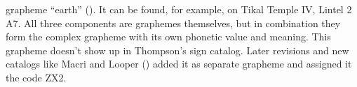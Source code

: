 \documentclass[../main.tex]{subfiles}
\begin{document}
grapheme  ``earth'' ().
It can be found, for example, on Tikal Temple IV, Lintel 2 A7.
All three components are graphemes themselves, but in combination they form the complex 
grapheme  with its own phonetic value and meaning.
This grapheme doesn't show up in Thompson's sign catalog.
Later revisions and new catalogs like Macri and Looper (\cite{macrilooper2003}) added it as
separate grapheme and assigned it the code ZX2.
\begin{figure}
    \centering
\end{figure}
\end{document}
